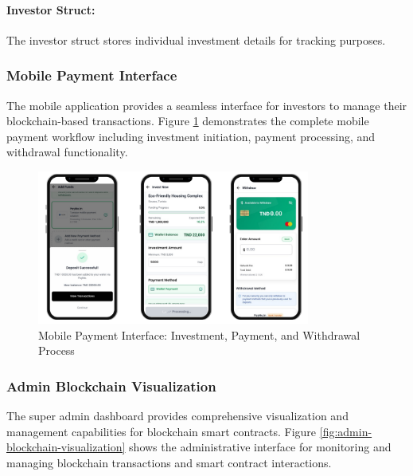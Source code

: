 \paragraph{Investor Struct:}
The investor struct stores individual investment details for tracking purposes.
\newpage
\subsubsection*{Mobile Payment Interface}

The mobile application provides a seamless interface for investors to manage their blockchain-based transactions. Figure \ref{fig:mobile-payment-interface} demonstrates the complete mobile payment workflow including investment initiation, payment processing, and withdrawal functionality.

\begin{figure}[htbp]
    \centering
    \includegraphics[width=0.8\textwidth]{images/mobile_payment_interface_combined.png}
    \caption{Mobile Payment Interface: Investment, Payment, and Withdrawal Process}
    \label{fig:mobile-payment-interface}
\end{figure}


\subsubsection*{Admin Blockchain Visualization}

The super admin dashboard provides comprehensive visualization and management capabilities for blockchain smart contracts. Figure \ref{fig:admin-blockchain-visualization} shows the administrative interface for monitoring and managing blockchain transactions and smart contract interactions.


